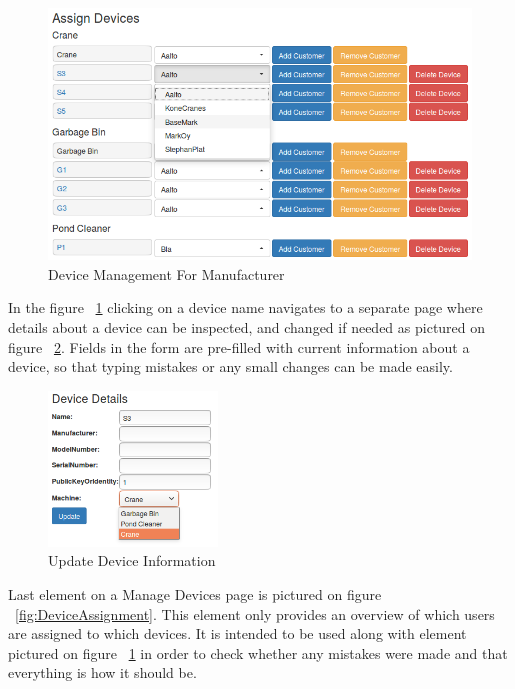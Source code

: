 \begin{figure}[ht]
	\begin{center}
		\includegraphics[width=\textwidth]{images/implementation/ManageDevicesCompany}
		\caption{Device Management For Manufacturer}
		\label{fig:ManageDevicesCompany}
	\end{center}
\end{figure}	

In the figure ~\ref{fig:ManageDevicesCompany} clicking on a device name navigates to a separate page where details about a device can be inspected, and changed if needed as pictured on figure ~\ref{fig:DeviceDetailsUpdate}. Fields in the form are pre-filled with current information about a device, so that typing mistakes or any small changes can be made easily.

\begin{figure}[ht]
	\begin{center}
		\includegraphics[width=0.4\textwidth]{images/implementation/DeviceDetailsUpdate}
		\caption{Update Device Information}
		\label{fig:DeviceDetailsUpdate}
	\end{center}
\end{figure}

Last element on a Manage Devices page is pictured on figure ~\ref{fig:DeviceAssignment}. This element only provides an overview of which users are assigned to which devices. It is intended to be used along with element pictured on figure ~\ref{fig:ManageDevicesCompany} in order to check whether any mistakes were made and that everything is how it should be.

